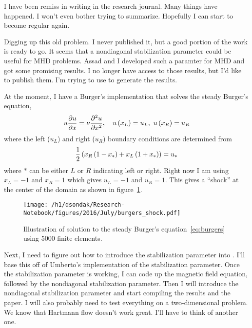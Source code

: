 



I have been remiss in writing in the research journal.  Many things have happened.
I won't even bother trying to summarize.  Hopefully I can start to become regular
again.

Digging up this old problem.  I never published it, but a good portion of the work is ready to go.
It seems that a nondiagonal stabilization parameter could be useful for MHD problems.  Assad and I
developed such a paramter for MHD and got some promising results.  I no longer have access to those
results, but I'd like to publish them.  I'm trying to use \fenics to generate the results.

At the moment, I have a Burger's implementation that solves the steady Burger's equation,
\begin{align}
 u\pdeone{u}{x} = \nu\pden{u}{x}{2}, \quad u\lr{x_{L}} = u_{L}, \ u\lr{x_{R}} = u_{R} \label{eq:burgers}
\end{align}
where the left ($u_{L}$) and right ($u_{R}$) boundary conditions are determined from
\begin{align}
  \frac{1}{2}\left(x_{R}\left(1-x_{*}\right) + x_{L}\left(1+x_{*}\right)\right) = u_{*}
\end{align}
where $*$ can be either $L$ or $R$ indicating left or right.  Right now I am using
$x_{L} = -1$ and $x_{R} = 1$ which gives $u_{L} = -1$ and $u_{R} = 1$.  This gives
a ``shock'' at the center of the domain as shown in figure~\ref{fig:burgers_shock}.
\begin{figure}[h!]
  \centering
  \texttt{[image: /h1/dsondak/Research-Notebook/figures/2016/July/burgers\_shock.pdf]}
  \caption{Illustration of \fenics solution to the steady Burger's equation~\eqref{eq:burgers} using $5000$ finite elements.}
  \label{fig:burgers_shock}
\end{figure}

Next, I need to figure out how to introduce the stabilization parameter into
\fenics.  I'll base this off of Umberto's \fenics implementation of the
stabilization parameter.  Once the stabilization parameter is working, I can 
code up the magnetic field equation, followed by the nondiagonal stabilization
parameter.  Then I will introduce the nondiagonal stabilization parameter and
start compiling the results and the paper.  I will also probably need to
test everything on a two-dimensional problem.  We know that Hartmann flow
doesn't work great.  I'll have to think of another one.

